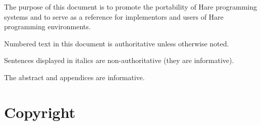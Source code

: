 
\specitem
The purpose of this document is to promote the portability of Hare programming
systems and to serve as a reference for implementors and users of Hare
programming environments.

\specitem
Numbered text in this document is authoritative unless otherwise noted.

\specitem
Sentences displayed in italics are non-authoritative (they are informative).


\specitem
The abstract and appendices are informative.

\section{Copyright}

